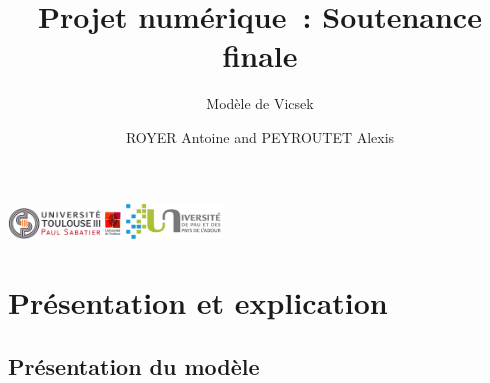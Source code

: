 \documentclass[aspectratio=43, a4paper, 12pt]{beamer}
\title{Projet numérique~: Soutenance finale}
\subtitle{Modèle de Vicsek}
\author{ROYER Antoine and PEYROUTET Alexis}
\institute{L3 PCAME – Tarbes}
\date{}
\begin{document}
	\begin{frame}
		\titlepage
		\includegraphics[width=3cm]{images/ut3.png} \hfill \includegraphics[width=2.5cm]{images/uppa.png}
	\end{frame}
	
\section{Présentation et explication}
\subsection{Présentation du modèle}
\end{document}
